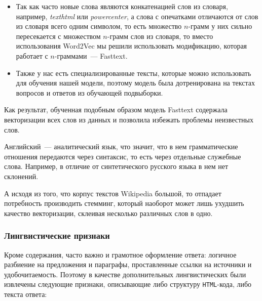 \documentclass[../diploma.tex]{subfiles}
\begin{document}
   	\begin{itemize}
   		\item
   		Так как часто новые слова являются конкатенацией слов из словаря, например, \textit{texthtml} или \textit{powercenter}, 
   		а слова с опечатками отличаются от слов из словаря всего одним символом, 
   		то есть множество $n$-грамм у них сильно пересекается с множеством $n$-грамм слов из словаря,
       	то вместо использования Word2Vec мы решили использовать модификацию, которая работает с $n$-граммами~--- Fasttext.

   		\item
   		Также у нас есть специализированные тексты, которые можно использовать для обучения нашей модели, поэтому 
   		модель была дотренирована на текстах вопросов и ответов из обучающей подвыборки.

   	\end{itemize}

   	Как результат, обученная подобным образом модель Fasttext содержала векторизации всех слов из данных и позволила избежать проблемы неизвестных слов.

   	Английский~--- аналитический язык, что значит, что в нем грамматические отношения передаются через синтаксис, то есть через отдельные служебные слова.
   	Например, в отличие от синтетического русского языка в нем нет склонений.

   	А исходя из того, что корпус текстов Wikipedia большой, то отпадает потребность производить стемминг, который наоборот может лишь ухудшить качество векторизации, 
   	склеивая несколько различных слов в одно.

	\subsubsection{Лингвистические признаки}

   	Кроме содержания, часто важно и грамотное оформление ответа: логичное разбиение на предложения и параграфы, проставленные ссылки на источники и удобочитаемость.
   	Поэтому в качестве дополнительных лингвистических были извлечены следующие признаки, описывающие либо структуру \texttt{HTML}-кода, либо текста ответа:
\end{document}
